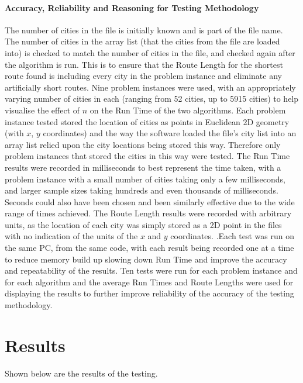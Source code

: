 \documentclass[conference,backref=page]{acmsiggraph}
\begin{document}
\paragraph{Accuracy, Reliability and Reasoning for Testing Methodology}
 The number of cities in the file is initially known and is part of the file name. The number of cities in the array list (that the cities from the file are loaded into) is checked to match the number of cities in the file, and checked again after the algorithm is run. This is to ensure that the Route Length for the shortest route found is including every city in the problem instance and eliminate any artificially short routes. Nine problem instances were used, with an appropriately varying number of cities in each (ranging from 52 cities, up to 5915 cities) to help visualise the effect of $n$ on the Run Time of the two algorithms. Each problem instance tested stored the location of cities as points in Euclidean 2D geometry (with $x$, $y$ coordinates) and the way the software loaded the file's city list into an array list relied upon the city locations being stored this way. Therefore only problem instances that stored the cities in this way were tested. The Run Time results were recorded in milliseconds to best represent the time taken, with a problem instance with a small number of cities taking only a few milliseconds, and larger sample sizes taking hundreds and even thousands of milliseconds. Seconds could also have been chosen and been similarly effective due to the wide range of times achieved. The Route Length results were recorded with arbitrary units, as the location of each city was simply stored as a 2D point in the files with no indication of the units of the $x$ and $y$ coordinates.  .Each test was run on the same PC, from the same code, with each result being recorded one at a time to reduce memory build up slowing down Run Time and improve the accuracy and repeatability of the results. Ten tests were run for each problem instance and for each algorithm and the average Run Times and Route Lengths were used for displaying the results to further improve reliability of the accuracy of the testing methodology.


\section{Results}
Shown below are the results of the testing.
\end{document}
